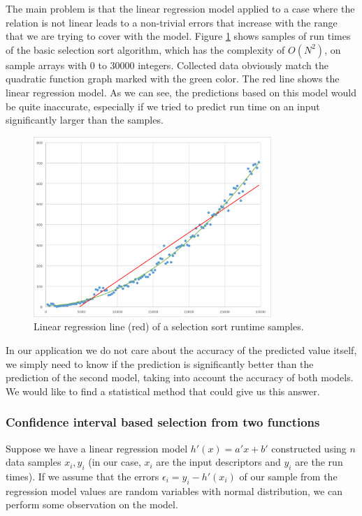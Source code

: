 The main problem is that the linear regression model applied to a case where the relation is not linear leads to a non-trivial errors that increase with the range that we are trying to cover with the model. Figure \ref{fig:selection_sort_linear_trendline} shows samples of run times of the basic selection sort algorithm, which has the complexity of \(O(N^2)\), on sample arrays with 0 to 30000 integers. Collected data obviously match the quadratic function graph marked with the green color. The red line shows the linear regression model. As we can see, the predictions based on this model would be quite inaccurate, especially if we tried to predict run time on an input significantly larger than the samples.

\begin{figure}[h!]
	\captionsetup{justification=centering,margin=0.5cm}
	\centerline{\mbox{\includegraphics[width=90mm]{./img/selection_sort_linear_trendline.png}}}
	\caption{Linear regression line (red) of a selection sort runtime samples.}
	\label{fig:selection_sort_linear_trendline}
\end{figure}

In our application we do not care about the accuracy of the predicted value itself, we simply need to know if the prediction is significantly better than the prediction of the second model, taking into account the accuracy of both models. We would like to find a statistical method that could give us this answer.

\subsubsection{Confidence interval based selection from two functions}
\label{subsubsec:confidence_interval_selection}

Suppose we have a linear regression model \(h'(x) = a' x + b'\) constructed using \(n\) data samples \(x_i, y_i\) (in our case, \(x_i\) are the input descriptors and \(y_i\) are the run times). If we assume that the errors $\epsilon_i = y_i - h'(x_i)$ of our sample from the regression model values are random variables with normal distribution, we can perform some observation on the model.

